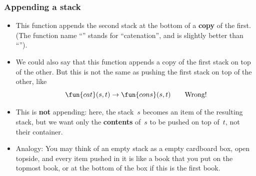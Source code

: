 \documentclass[compress,dvips,xcolor={dvipsnames},t]{beamer}
\begin{document}
\begin{frame}
  \frametitle{Appending a stack}

  \begin{itemize}

    \item This function appends the second stack at the bottom of a
      \textbf{copy} of the first. (The function name ``''
      stands for ``catenation'', and is slightly better than
      ``'').

    \item We could also say that this function appends a copy of the
      first stack on top of the other. But this is not the same as
      pushing the first stack on top of the other, like
      \begin{equation*}
        \fun{cat}(s,t) \rightarrow \fun{cons}(s,t) \qquad
        \text{Wrong!}
      \end{equation*}

    \item This is \textbf{not} appending: here, the stack~\(s\)
      becomes an item of the resulting stack, but we want only the
      \textbf{contents} of~\(s\) to be pushed on top of~\(t\), not
      their container.

    \item Analogy: You may think of an empty stack as a empty
      cardboard box, open topside, and every item pushed in it is like
      a book that you put on the topmost book, or at the bottom of the
      box if this is the first book.

  \end{itemize}

\end{frame}
\end{document}
